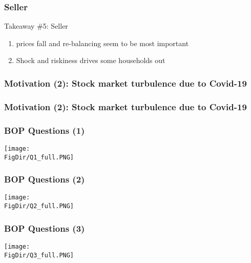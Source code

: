 \documentclass[pdflatex]{beamer}
\begin{document}
\begin{frame}[noframenumbering]
	\frametitle{Seller}
	\begin{block}{Takeaway \#5: Seller}
		{
			\begin{enumerate}
				\item prices fall and re-balancing seem to be most important
				\item Shock and riskiness drives some households out
			\end{enumerate}
		}
	\end{block}
	
\end{frame}

\begin{frame}[label = sp500, noframenumbering]
	\frametitle{Motivation (2): Stock market turbulence due to Covid-19}
	
	\vspace{-1em}
	\hyperlink{motivation_2}{}
\end{frame}

\begin{frame}[label = eurostoxx50, noframenumbering]
	\frametitle{Motivation (2): Stock market turbulence due to Covid-19}
	
	\vspace{-1em}
	\hyperlink{motivation_2}{}
\end{frame}


\begin{frame}[label = BOP Q1, noframenumbering]
	\frametitle{BOP Questions (1)}
	\hyperlink{Timeline}{}
	\centering
	\texttt{[image: \\FigDir/Q1\_full.PNG]}
\end{frame}

\begin{frame}[label = BOP Q2, noframenumbering]
	\frametitle{BOP Questions (2)}
	\hyperlink{Timeline}{}
	\centering
	\texttt{[image: \\FigDir/Q2\_full.PNG]}
\end{frame}

\begin{frame}[label = BOP Q3, noframenumbering]
	\frametitle{BOP Questions (3)}
	\hyperlink{Timeline}{}
	\centering
	\texttt{[image: \\FigDir/Q3\_full.PNG]}
\end{frame}
\end{document}
